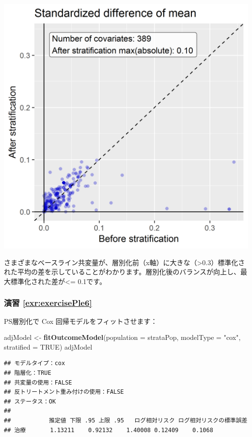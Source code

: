 \documentclass[
  11pt]{book}
\newenvironment{Shaded}{\begin{snugshade}}{\end{snugshade}}
\newcommand{\AttributeTok}[1]{\textcolor[rgb]{0.13,0.29,0.53}{#1}}
\newcommand{\ConstantTok}[1]{\textcolor[rgb]{0.56,0.35,0.01}{#1}}
\newcommand{\FunctionTok}[1]{\textcolor[rgb]{0.13,0.29,0.53}{\textbf{#1}}}
\newcommand{\NormalTok}[1]{#1}
\newcommand{\OtherTok}[1]{\textcolor[rgb]{0.56,0.35,0.01}{#1}}
\newcommand{\StringTok}[1]{\textcolor[rgb]{0.31,0.60,0.02}{#1}}
\theoremstyle{definition}
\theoremstyle{definition}
\theoremstyle{definition}
\theoremstyle{definition}
\theoremstyle{remark}
\begin{document}
\begin{center}\includegraphics[width=0.7\linewidth]{images/SuggestedAnswers/scatter} \end{center}

さまざまなベースライン共変量が、層別化前（x軸）に大きな（\textgreater0.3）標準化された平均の差を示していることがわかります。層別化後のバランスが向上し、最大標準化された差が\textless= 0.1です。

\subsubsection*{演習 \ref{exr:exercisePle6}}\label{ux6f14ux7fd2-refexrexerciseple6}

PS層別化で Cox 回帰モデルをフィットさせます：

\begin{Shaded}
\begin{Highlighting}[]
\NormalTok{adjModel }\OtherTok{\textless{}{-}} \FunctionTok{fitOutcomeModel}\NormalTok{(}\AttributeTok{population =}\NormalTok{ strataPop,}
                         \AttributeTok{modelType =} \StringTok{"cox"}\NormalTok{,}
                         \AttributeTok{stratified =} \ConstantTok{TRUE}\NormalTok{)}
\NormalTok{adjModel}
\end{Highlighting}
\end{Shaded}

\begin{verbatim}
## モデルタイプ：cox
## 階層化：TRUE
## 共変量の使用：FALSE
## 反トリートメント重み付けの使用：FALSE
## ステータス：OK
## 
##           推定値 下限 .95 上限 .95   ログ相対リスク ログ相対リスクの標準誤差
## 治療       1.13211    0.92132    1.40008 0.12409    0.1068
\end{verbatim}
\end{document}
